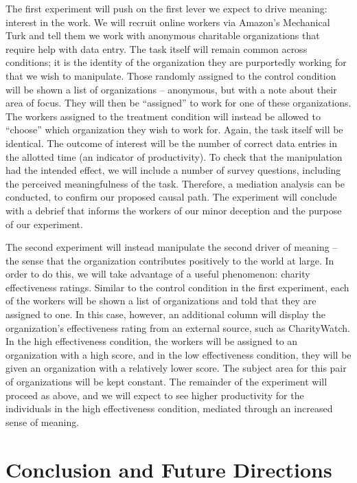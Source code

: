 \documentclass[12pt]{article}
\begin{document}
The first experiment will push on the first lever we expect to drive meaning: interest in the work. We will recruit online workers via Amazon's Mechanical Turk and tell them we work with anonymous charitable organizations that require help with data entry. The task itself will remain common across conditions; it is the identity of the organization they are purportedly working for that we wish to manipulate. Those randomly assigned to the control condition will be shown a list of organizations -- anonymous, but with a note about their area of focus.  They will then be ``assigned'' to work for one of these organizations. The workers assigned to the treatment condition will instead be allowed to ``choose'' which organization they wish to work for. Again, the task itself will be identical. The outcome of interest will be the number of correct data entries in the allotted time (an indicator of productivity). To check that the manipulation had the intended effect, we will include a number of survey questions, including the perceived meaningfulness of the task. Therefore, a mediation analysis can be conducted, to confirm our proposed causal path. The experiment will conclude with a debrief that informs the workers of our minor deception and the purpose of our experiment.

The second experiment will instead manipulate the second driver of meaning -- the sense that the organization contributes positively to the world at large. In order to do this, we will take advantage of a useful phenomenon: charity effectiveness ratings. Similar to the control condition in the first experiment, each of the workers will be shown a list of organizations and told that they are assigned to one. In this case, however, an additional column will display the organization's effectiveness rating from an external source, such as CharityWatch. In the high effectiveness condition, the workers will be assigned to an organization with a high score, and in the low effectiveness condition, they will be given an organization with a relatively lower score. The subject area for this pair of organizations will be kept constant. The remainder of the experiment will proceed as above, and we will expect to see higher productivity for the individuals in the high effectiveness condition, mediated through an increased sense of meaning. 


\section{Conclusion and Future Directions}
\end{document}

